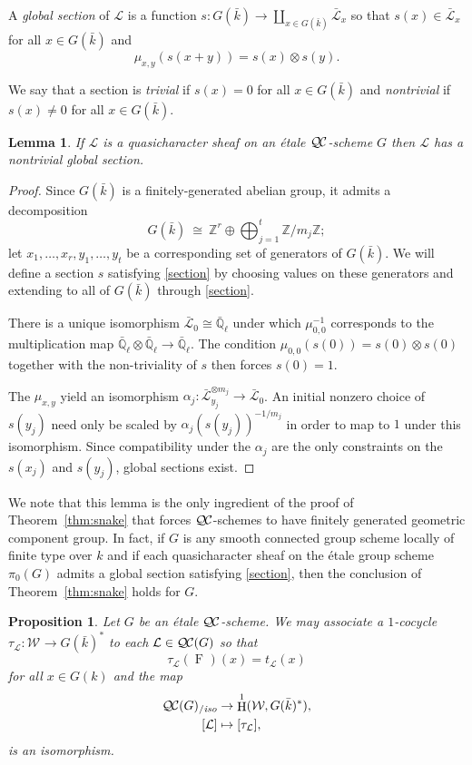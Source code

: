 \documentclass[11pt]{amsart}
\theoremstyle{plain}
\newtheorem{proposition}[theorem]{Proposition}
\newtheorem{lemma}[theorem]{Lemma}
\theoremstyle{definition}
\theoremstyle{remark}
\newcommand{\ZZ}{{\mathbb{Z}}}
\newcommand{\EE}{\mathbb{\bar Q}_\ell}
\newcommand{\bFq}{\bar{k}}
\newcommand{\Fq}{k}
\newcommand{\Frob}[1]{\operatorname{F}_{#1}}
\DeclareMathOperator{\Hh}{H}
\newcommand{\iso}{{\ \cong\ }}
\newcommand{\qcs}[1]{{\mathcal{#1}}}
\newcommand{\gqcs}[1]{{\mathcal{\bar #1}}}
\newcommand{\QC}{{\mathcal{Q\hskip-0.8pt C}}}
\newcommand{\QCiso}[1]{\QC(#1)_{/\textit{iso}}}
\newcommand{\Weil}[1]{\mathcal{W}_{#1}}
\newcommand{\trFrob}[1]{t_{#1}}
\begin{document}
A \emph{global section} of $\qcs{L}$ is a function $s : G(\bFq) \to \coprod_{x \in G(\bFq)} \gqcs{L}_x$ so that $s(x) \in \gqcs{L}_x$ for all $x \in G(\bFq)$ and
\begin{equation}\label{section}
\mu_{x,y}(s(x+y)) = s(x) \otimes s(y).
\end{equation}

We say that a section is \emph{trivial} if $s(x) = 0$ for all $x \in G(\bFq)$ and \emph{nontrivial} if $s(x) \ne 0$ for all $x \in G(\bFq)$.

\begin{lemma}\label{lemma:section}
 If $\qcs{L}$ is a quasicharacter sheaf on an \'etale $\QC$-scheme $G$ then $\qcs{L}$ has a nontrivial global section.
\end{lemma}

\begin{proof}
  Since $G(\bFq)$ is a finitely-generated abelian group, it admits a decomposition
  \[
  G(\bFq) \iso \ZZ^r \oplus \bigoplus_{j=1}^t \ZZ / m_j \ZZ;
  \]
  let $x_1, \ldots, x_r, y_1, \ldots, y_t$ be a corresponding set of generators of $G(\bFq)$.
  We will define a section $s$ satisfying \eqref{section} by choosing values on these generators and extending to all
  of $G(\bFq)$ through \eqref{section}.
  
  There is a unique isomorphism $\gqcs{L}_0 \cong \EE$ under which $\mu_{0,0}^{-1}$ corresponds
  to the multiplication map $\EE \otimes\EE \to \EE$.
  The condition $\mu_{0,0}(s(0)) = s(0) \otimes s(0)$ together with the non-triviality of $s$
  then forces $s(0) = 1$.
  
  The $\mu_{x,y}$ yield an isomorphism $\alpha_j : \gqcs{L}_{y_j}^{\otimes m_j} \to \gqcs{L}_0$.
  An initial nonzero choice of $s(y_j)$ need only be scaled by $\alpha_j(s(y_j))^{-1/m_j}$ in order to map to
  $1$ under this isomorphism.  Since compatibility under the $\alpha_j$ are the only constraints on the
  $s(x_j)$ and $s(y_j)$, global sections exist.
\end{proof}

We note that this lemma is the only ingredient of the proof of Theorem~\ref{thm:snake}
that forces $\QC$-schemes to have finitely generated geometric component group.  In fact,
if $G$ is any smooth connected group scheme locally of finite type over $\Fq$
and if each quasicharacter sheaf on the \'etale group scheme $\pi_0(G)$ admits a global section 
satisfying \eqref{section}, then the conclusion of Theorem~\ref{thm:snake} holds for $G$.

\begin{proposition}\label{prop:etale}
  Let $G$ be an \'etale $\QC$-scheme.
  We may associate a $1$-cocycle $\tau_\qcs{L}: \Weil{}\to G(\bFq)^*$ to each $\qcs{L} \in \QC(G)$
  so that
  \[
  \tau_\qcs{L}(\Frob{})(x) = \trFrob{\qcs{L}}(x)
  \]
  for all $x \in G(\Fq)$ and the map
  \begin{align*}
  \QCiso{G} &\to \Hh^1(\Weil{}, G(\bFq)^*), \\
  [\qcs{L}] &\mapsto [\tau_\qcs{L}],
  \end{align*}
  is an isomorphism.
\end{proposition}
\end{document}
